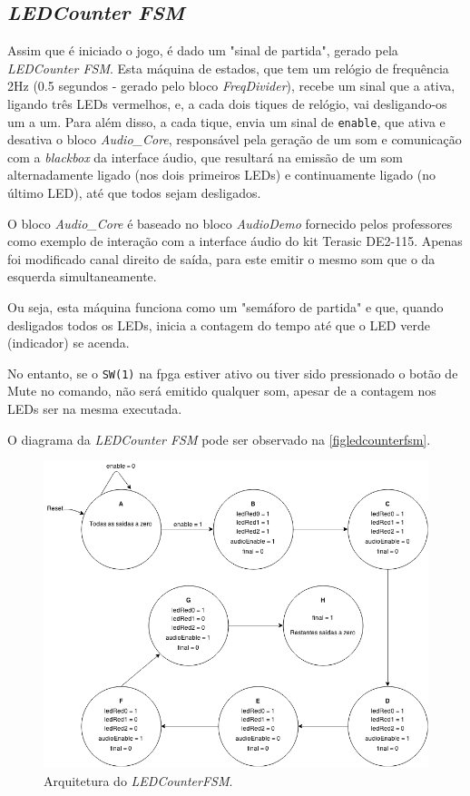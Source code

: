 \documentclass[a4paper,11pt,onecolumn]{report}
\begin{document}
\subsection{\textit{LEDCounter FSM}}

Assim que é iniciado o jogo, é dado um "sinal de partida", gerado pela \textit{LEDCounter FSM}. Esta máquina de estados, que tem um relógio de frequência 2Hz (0.5 segundos - gerado pelo bloco \textit{FreqDivider}), recebe um sinal que a ativa, ligando três LEDs vermelhos, e, a cada dois tiques de relógio, vai desligando-os um a um. Para além disso, a cada tique, envia um sinal de \texttt{enable}, que ativa e desativa o bloco \textit{Audio\_Core}, responsável pela geração de um som e comunicação com a \textit{blackbox} da interface áudio, que resultará na emissão de um som alternadamente ligado (nos dois primeiros LEDs) e continuamente ligado (no último LED), até que todos sejam desligados.

O bloco \textit{Audio\_Core} é baseado no bloco \textit{AudioDemo} fornecido pelos professores como exemplo de interação com a interface áudio do kit Terasic DE2-115. Apenas foi modificado canal direito de saída, para este emitir o mesmo som que o da esquerda simultaneamente.

Ou seja, esta máquina funciona como um "semáforo de partida" e que, quando desligados todos os LEDs, inicia a contagem do tempo até que o LED verde (indicador) se acenda.

No entanto, se o \texttt{SW(1)} na \ac{fpga} estiver ativo ou tiver sido pressionado o botão de Mute no comando, não será emitido qualquer som, apesar de a contagem nos LEDs ser na mesma executada.

O diagrama da \textit{LEDCounter FSM} pode ser observado na \autoref{figledcounterfsm}.

\begin{figure}[h]
\centerline{\includegraphics[scale=0.30]{Images/LEDCounterFSMDiagram}}
\caption{Arquitetura do \textit{LEDCounterFSM}.}
\label{figledcounterfsm}
\end{figure}
\end{document}
